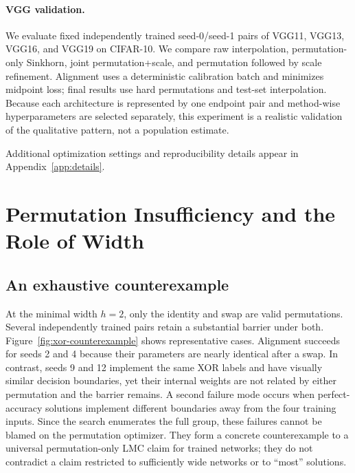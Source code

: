 \documentclass{article}
\begin{document}
\paragraph{VGG validation.}
We evaluate fixed independently trained seed-0/seed-1 pairs of VGG11, VGG13,
VGG16, and VGG19 on CIFAR-10.  We compare raw interpolation, permutation-only
Sinkhorn, joint permutation+scale, and permutation followed by scale
refinement.  Alignment uses a deterministic calibration batch and minimizes
midpoint loss; final results use hard permutations and test-set interpolation.
Because each architecture is represented by one endpoint pair and method-wise
hyperparameters are selected separately, this experiment is a realistic
validation of the qualitative pattern, not a population estimate.

Additional optimization settings and reproducibility details appear in
Appendix~\ref{app:details}.

\section{Permutation Insufficiency and the Role of Width}
\label{sec:xor}

\subsection{An exhaustive counterexample}

At the minimal width $h=2$, only the identity and swap are valid permutations.
Several independently trained pairs retain a substantial barrier under both.
Figure~\ref{fig:xor-counterexample} shows representative cases.  Alignment
succeeds for seeds 2 and 4 because their parameters are nearly identical after
a swap.  In contrast, seeds 9 and 12 implement the same XOR labels and have
visually similar decision boundaries, yet their internal weights are not
related by either permutation and the barrier remains.  A second failure mode
occurs when perfect-accuracy solutions implement different boundaries away from
the four training inputs.  Since the search enumerates the full group, these
failures cannot be blamed on the permutation optimizer.  They form a concrete
counterexample to a universal permutation-only LMC claim for trained networks;
they do not contradict a claim restricted to sufficiently wide networks or to
``most'' solutions.
\end{document}
